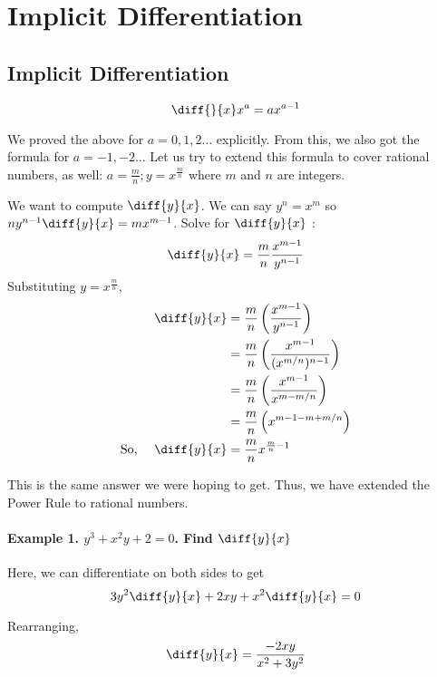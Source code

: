 

\chapter{Implicit Differentiation}

\bigbreak
\section{Implicit Differentiation}

$$ \diff{}{x} x^a = ax^{a-1} $$

We proved the above for $a = 0, 1, 2\ldots$ explicitly.
From this, we also got the formula for $a = -1, -2\ldots$
Let us try to extend this formula to cover rational numbers, as well:
$ a = \frac{m}{n}; y = x^{\frac{m}{n}}$ where $m$ and $n$ are integers.

We want to compute $\diff{y}{x}$. 
We can say $y^n = x^m$ so $ny^{n-1}\diff{y}{x} = mx^{m-1}$.
Solve for $\diff{y}{x}$ :
$$ \diff{y}{x} = \frac{m}{n} \frac{x^{m-1}}{y^{n-1}} $$
Substituting $y = x^{\frac{m}{n}}$,
\begin{equation*}
\begin{split}
	\diff{y}{x} & = \frac{m}{n} \left( \frac{x^{m-1}}{y^{n-1}} \right) \\
		& = \frac{m}{n} \left( \frac{x^{m-1}}{(x^{m/n})^{n-1}} \right) \\
		& = \frac{m}{n} \left( \frac{x^{m-1}}{x^{m-m/n}} \right) \\
		& = \frac{m}{n} \left( x^{m - 1 - m + m/n} \right) \\
\text{So, } \quad \diff{y}{x} & = \frac{m}{n} x^{\frac{m}{n} - 1} \\
\end{split}
\end{equation*}

This is the same answer we were hoping to get. 
Thus, we have extended the Power Rule to rational numbers.

\subsubsection*{Example 1. $y^3+x^2y+2 = 0$. Find $\diff{y}{x}$}

Here, we can differentiate on both sides to get 
$$ 3y^2\diff{y}{x} + 2xy + x^2\diff{y}{x} = 0 $$

Rearranging, $$ \diff{y}{x} = \frac{-2xy}{x^2+3y^2} $$
